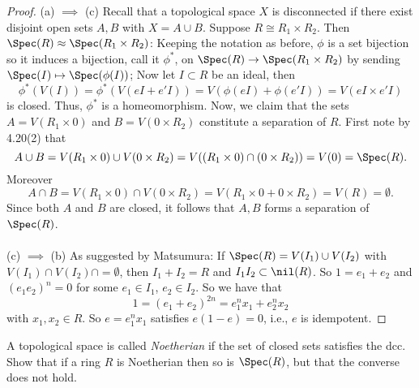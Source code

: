 \begin{proof}
(a) $\implies$ (c) Recall that a topological space $X$ is
disconnected if there exist disjoint open sets $A,B$ with
$X=A\cup B$. Suppose $R\cong R_1\times R_2$. Then
$\Spec(R)\approx \Spec(R_1\times R_2)$: Keeping the notation as
before, $\phi$ is a set bijection so it induces a bijection, call
it $\phi^*$, on $\Spec(R)\to\Spec(R_1\times R_2)$ by sending
$\Spec(I)\mapsto\Spec(\phi(I))$; Now let $I\subset R$ be an
ideal, then
\[
\phi^*(V(I))=\phi^*\left(V(eI+e'I)\right)=V(\phi(eI)+\phi(e'I))=V(eI\times e'I)
\]
is closed. Thus, $\phi^*$ is a homeomorphism. Now, we claim that
the sets $A=V(R_1\times 0)$ and $B=V(0\times R_2)$ constitute a
separation of $R$. First note by 4.20(2) that
\[
A\cup B=V(R_1\times 0)\cup V(0\times R_2)=V((R_1\times
0)\cap(0\times R_2))=V(0)=\Spec(R).
\]
Moreover
\[
A\cap B=V(R_1\times 0)\cap V(0\times R_2)=V(R_1\times 0+0\times R_2)=V(R)=\emptyset.
\]
Since both $A$ and $B$ are closed, it follows that $A,B$ forms a
separation of $\Spec(R)$.
\\\\
(c) $\implies$ (b)
As suggested by Matsumura: If $\Spec(R)=V(I_1)\cup V(I_2)$ with
$V(I_1)\cap V(I_2)\cap=\emptyset$, then $I_1+I_2=R$ and
$I_1I_2\subset\nil(R)$. So $1=e_1+e_2$ and $(e_1e_2)^n=0$ for
some $e_1\in I_1$, $e_2\in I_2$. So we have that
\[
1=(e_1+e_2)^{2n}=e_1^nx_1+e_2^nx_2
\]
with $x_1,x_2\in R$. So $e=e_1^nx_1$ satisfies $e(1-e)=0$, i.e.,
$e$ is idempotent.
\end{proof}
\newpage
\begin{problem}
A topological space is called \emph{Noetherian} if the set of
closed sets satisfies the dcc. Show that if a ring $R$ is
Noetherian then so is $\Spec(R)$, but that the converse does not
hold.
\end{problem}
